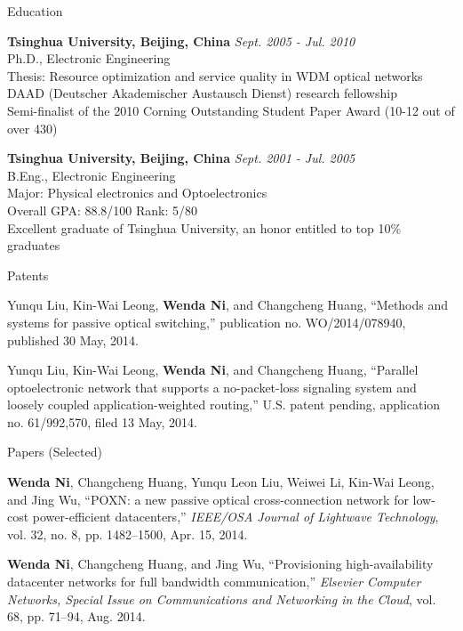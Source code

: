 \documentclass{resume} %
\begin{document}
\begin{rSection}{Education}

{\bf Tsinghua University, Beijing, China} \hfill {\em Sept. 2005 - Jul. 2010} \\ 
Ph.D., Electronic Engineering \\
Thesis: Resource optimization and service quality in WDM optical networks \\
DAAD (Deutscher Akademischer Austausch Dienst) research fellowship \\
Semi-finalist of the 2010 Corning Outstanding Student Paper Award (10-12 out of over 430)

{\bf Tsinghua University, Beijing, China} \hfill {\em Sept. 2001 - Jul. 2005} \\ 
B.Eng., Electronic Engineering \\
Major: Physical electronics and Optoelectronics \\
Overall GPA: 88.8/100 Rank: 5/80 \\
Excellent graduate of Tsinghua University, an honor entitled to top 10\% graduates

\end{rSection}



\begin{rSection}{Patents}

Yunqu Liu, Kin-Wai Leong, \textbf{Wenda Ni}, and Changcheng Huang, ``Methods and systems for passive optical switching,'' publication no. WO/2014/078940, published 30 May, 2014.

Yunqu Liu, Kin-Wai Leong, \textbf{Wenda Ni}, and Changcheng Huang, ``Parallel optoelectronic network that supports a no-packet-loss signaling system and loosely coupled application-weighted routing,'' U.S. patent pending, application no. 61/992,570, filed 13 May, 2014.
\end{rSection}



\begin{rSection}{Papers (Selected)}

\textbf{Wenda Ni}, Changcheng Huang, Yunqu Leon Liu, Weiwei Li, Kin-Wai Leong, and Jing Wu, ``POXN: a new passive optical cross-connection network for low-cost power-efficient datacenters,'' \textit{IEEE/OSA Journal of Lightwave Technology}, vol. 32, no. 8, pp. 1482--1500, Apr. 15, 2014.

\textbf{Wenda Ni}, Changcheng Huang, and Jing Wu, ``Provisioning high-availability datacenter networks for full bandwidth communication,'' \textit{Elsevier Computer Networks, Special Issue on Communications and Networking in the Cloud}, vol. 68, pp. 71--94, Aug. 2014.

\end{rSection}
\end{document}
